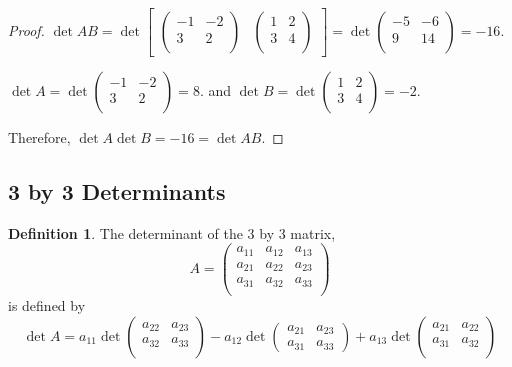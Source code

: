 \documentclass[11pt,a4paper]{article}
\theoremstyle{definition}
\newtheorem{defn}[thm]{Definition}
\begin{document}
\begin{proof}
$\det AB=\det
\begin{bmatrix}
\begin{pmatrix}
-1&-2\\3&2\\
\end{pmatrix}
&
\begin{pmatrix}
1&2\\3&4\\
\end{pmatrix}
\end{bmatrix}
=\det
\begin{pmatrix}
-5&-6\\9&14\\
\end{pmatrix}
=-16
$.

$\det A=\det 
\begin{pmatrix}
-1&-2\\3&2\\
\end{pmatrix}
=8.
$ and 
$\det B=\det
\begin{pmatrix}
1&2\\3&4\\
\end{pmatrix}
=-2
$.

Therefore, $\det A\det B=-16=\det AB$.
\end{proof}


\subsection{3 by 3 Determinants}
\begin{defn}
The determinant of the 3 by 3 matrix,
$$ A=
\begin{pmatrix}
a_{11}&a_{12}&a_{13}\\
a_{21}&a_{22}&a_{23}\\
a_{31}&a_{32}&a_{33}\\
\end{pmatrix}
$$
is defined by 
$$\det A=
a_{11}\det
\begin{pmatrix}
a_{22}&a_{23}\\
a_{32}&a_{33}\\
\end{pmatrix}
-a_{12}\det
\begin{pmatrix}
a_{21}&a_{23}\\
a_{31}&a_{33}
\end{pmatrix}
+a_{13}\det
\begin{pmatrix}
a_{21}&a_{22}\\
a_{31}&a_{32}\\
\end{pmatrix}
$$
\end{defn}
\end{document}
